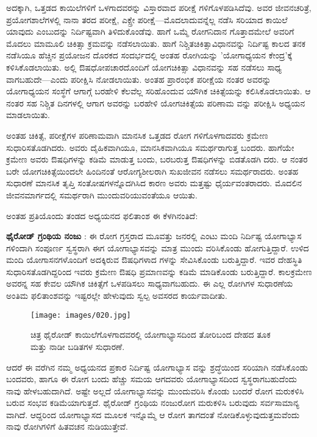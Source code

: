 ಅದಕ್ಕಾಗಿ, ಒತ್ತಡದ ಕಾಯಿಲೆಗಳಿಗೆ ಒಳಗಾದವರನ್ನು ವಿಸ್ತಾರವಾದ ಪರೀಕ್ಷೆ ಗಳಿಗೊಳಪಡಿಸಿದೆವು. ಅವರ ಜೀವನಚರಿತ್ರೆ, ಪ್ರಯೋಗಶಾಲೆಗಳಲ್ಲಿ ನಾನಾ ತರದ ಪರೀಕ್ಷೆ, ಎಕ್ಸ್ರೇ ಪರೀಕ್ಷೆ—ಮೊದಲಾದುವನ್ನೆಲ್ಲ ನಡೆಸಿ ಸರಿಯಾದ ಕಾಯಿಲೆ ಯಾವುದು ಎಂಬುದನ್ನು ನಿರ್ದಿಷ್ಟವಾಗಿ ತಿಳಿದುಕೊಂಡೆವು. ಹಾಗೆ ಒಮ್ಮೆ ರೋಗನಿದಾನ ಗೊತ್ತಾದಮೇಲೆ ಅವರಿಗೆ ಮೊದಲು ಮಾಮೂಲಿ ಚಿಕಿತ್ಸಾ ಕ್ರಮವನ್ನು ನಡೆಸಲಾಯಿತು. ಹಾಗೆ ನಿಶ್ಚಿತಚಿಕಿತ್ಸಾವಿಧಾನವನ್ನು ನಿರ್ದಿಷ್ಟ ಕಾಲದ ತನಕ ನಡೆಸಿಯೂ ಹೆಚ್ಚಿನ ಪ್ರಯೋಜನ ದೊರಕದ ಸಂದರ್ಭದಲ್ಲಿ ಅಂತಹ ರೋಗಿಯನ್ನು 'ಯೋಗಾಧ್ಯಯನ ಕೇಂದ್ರ'ಕ್ಕೆ ಕಳಿಸಿಕೊಡಲಾಯಿತು. ಅಲ್ಲಿ ಔಷಧೋಪಚಾರದೊಂದಿಗೆ ಯೋಗಚಿಕಿತ್ಸಾ ವಿಧಾನವನ್ನು ಸಹ ನಡೆಸಲು ಸಾಧ್ಯ ವಾಗಬಹುದೇ—ಎಂದು ಪರೀಕ್ಷಿಸಿ ನೋಡಲಾಯಿತು. ಅಂತಹ ಪ್ರಾರಂಭಿಕ ಪರೀಕ್ಷೆಯ ನಂತರ ಅವರನ್ನು ಯೋಗಾಧ್ಯಯನ ಸಂಸ್ಥೆಗೆ ಆಗಾಗ್ಗೆ ಬರಹೇಳಿ ಕೆಲವೆಲ್ಲ ಸರಿಹೊಂದುವ ಯೌಗಿಕ ಚಿಕಿತ್ಸೆಯನ್ನು ಕಲಿಸಿಕೊಡಲಾಯಿತು. ಆ ನಂತರ ಸಹ ನಿಶ್ಚಿತ ದಿನಗಳಲ್ಲಿ ಆಗಾಗ ಅವರನ್ನು ಬರಹೇಳಿ ಯೋಗಚಿಕಿತ್ಸೆಯ ಪರಿಣಾಮ ವನ್ನು ಪರೀಕ್ಷಿಸಿ ಅಧ್ಯಯನ ಮಾಡಲಾಯಿತು.

ಅಂತಹ ಚಿಕಿತ್ಸೆ, ಪರೀಕ್ಷೆಗಳ ಪರಿಣಾಮವಾಗಿ ಮಾನಸಿಕ ಒತ್ತಡದ ರೋಗ ಗಳಿಗೊಳಗಾದವರು ಕ್ರಮೇಣ ಸುಧಾರಿಸತೊಡಗಿದರು. ಅವರು ದೈಹಿಕವಾಗಿಯೂ, ಮಾನಸಿಕವಾಗಿಯೂ ಸಮರ್ಥರಾಗುತ್ತ ಬಂದರು. ಹಾಗೆಯೇ ಕ್ರಮೇಣ ಅವರು ಔಷಧಿಗಳನ್ನು ಕಡಿಮೆ ಮಾಡುತ್ತ ಬಂದು, ಬರಬರುತ್ತ ಔಷಧಿಗಳನ್ನು ಬಿಡತೊಡಗಿ ದರು. ಆ ನಂತರ ಬರೇ ಯೋಗಚಿಕಿತ್ಸೆಯಿಂದಲೇ ಹಿಂದಿನಂತೆ ಆರೋಗ್ಯಶೀಲರಾಗಿ ಸುಖಜೀವನ ನಡೆಸಲು ಸಮರ್ಥರಾದರು. ಅಂತಹ ಸುಧಾರಣೆ ಮಾನಸಿಕ ತೃಪ್ತಿ ಸಂತೋಷಗಳನ್ನೊದಗಿಸಿದ ಕಾರಣ ಅವರು ಮತ್ತಷ್ಟು ಧೈರ್ಯವಂತರಾದರು. ಮೊದಲಿನ ಜೀವನಮಾರ್ಗದಲ್ಲಿ ಸಮರ್ಥರಾಗಿ ಮುಂದುವರಿಯುವಂತೆಯೂ ಆಯಿತು.

ಅಂತಹ ಪ್ರತಿಯೊಂದು ತಂಡದ ಅಧ್ಯಯನದ ಫಲಿತಾಂಶ ಈ ಕೆಳಗಿನಂತಿದೆ:

\textbf{ಥೈರೋಡ್ ಗ್ರಂಥಿಯ ನಂಜು} : ಈ ರೋಗ ಗ್ರಸ್ತರಾದ ಮೂವತ್ತು ಜನರಲ್ಲಿ ಎಂಟು ಮಂದಿ ನಿರ್ದಿಷ್ಟ ಯೋಗಾಭ್ಯಾಸ ಗಳಿಂದಾಗಿ ಸಂಪೂರ್ಣ ಸ್ವಸ್ಥರಾಗಿ ಈಗ ಯೋಗಾಭ್ಯಾಸವನ್ನು ಮಾತ್ರ ಮುಂದು ವರಿಸಿಕೊಂಡು ಹೋಗುತ್ತಿದ್ದಾರೆ. ಉಳಿದ  ಮಂದಿ ಯೋಗಾಸನಗಳೊಂದಿಗೆ ಅದಕ್ಕಿರುವ ಔಷಧಿಗಳಾದ  ಗಳನ್ನು ಸೇವಿಸಿಕೊಂಡು ಬರುತ್ತಿದ್ದಾರೆ. ಇವರ ದೇಹಸ್ಥಿತಿ ಸುಧಾರಿಸತೊಡಗಿದ್ದರಿಂದ ಇವರು ಕ್ರಮೇಣ ಔಷಧಿ ಪ್ರಮಾಣವನ್ನು ಕಡಿಮೆ ಮಾಡಿಕೊಂಡು ಬರುತ್ತಿದ್ದಾರೆ. ಕಾಲಕ್ರಮೇಣ ಅವರನ್ನ ಸಹ ಕೇವಲ ಯೌಗಿಕ ಚಿಕಿತ್ಸೆಗೆ ಒಳಪಡಿಸಲು ಸಾಧ್ಯವಾಗಬಹುದು. ಈ ಎಲ್ಲ ರೋಗಿಗಳ ಸುಧಾರಣೆಯ ಅಂತಿಮ ಫಲಿತಾಂಶವನ್ನು ಇಷ್ಟರಲ್ಲೇ ಹೇಳುವುದು ಸ್ವಲ್ಪ ಅವಸರದ ಕಾರ್ಯವಾದೀತು.

\begin{figure}
\texttt{[image: images/020.jpg]}
\caption{ಚಿತ್ರ  ಥೈರೋಡ್ ಕಾಯಿಲೆಗೊಳಗಾದವರಲ್ಲಿ ಯೋಗಾಭ್ಯಾಸದಿಂದ ತೋರಿಬಂದ ದೇಹದ ತೂಕ ಮತ್ತು ನಾಡೀ ಬಡಿತಗಳ ಸುಧಾರಣೆ.}
\end{figure}

ಆದರೆ ಈ ವರೆಗಿನ ನಮ್ಮ ಅಧ್ಯಯನದ ಪ್ರಕಾರ ನಿರ್ದಿಷ್ಟ ಯೋಗಾಭ್ಯಾಸ ವನ್ನು ಶ್ರದ್ಧೆಯಿಂದ ಸರಿಯಾಗಿ ನಡೆಸಿಕೊಂಡು ಬಂದವರು, ಹಾಗೂ ಈ ರೋಗ ಬಂದು ಹೆಚ್ಚು ಸಮಯ ಆಗದವರು ಯೋಗಾಭ್ಯಾಸದಿಂದ ಸ್ವಸ್ಥರಾಗಬಹುದೆಂದು ನಾವು ಹೇಳಬಹುದಾಗಿದೆ. ಅಷ್ಟೇ ಅಲ್ಲದೆ ಯೋಗಾಭ್ಯಾಸವನ್ನು ಮುಂದುವರಿಸಿ ಕೊಂಡು ಬಂದರೆ ರೋಗ ಮರುಕಳಿಸಿ ಬರುವ ಸಂಭವ ಕಡಿಮೆಯಾಗುತ್ತದೆ. ಥೈರೋಡ್ ಗ್ರಂಥಿಯ ನಂಜುರೋಗ ಮರುಕಳಿಸಿ ಬರುವುದು ಸರ್ವಸಾಮಾನ್ಯ ವಾಗಿದೆ. ಆದ್ದರಿಂದ ಯೋಗಾಭ್ಯಾಸದ ಮೂಲಕ ಇನ್ನೊಮ್ಮೆ ಆ ರೋಗ ತಾಗದಂತೆ ನೋಡಿಕೊಳ್ಳುವುದುತ್ತಮವೆಂದು ನಾವು ರೋಗಿಗಳಿಗೆ ಹಿತವಚನ ನುಡಿಯುತ್ತೇವೆ.


